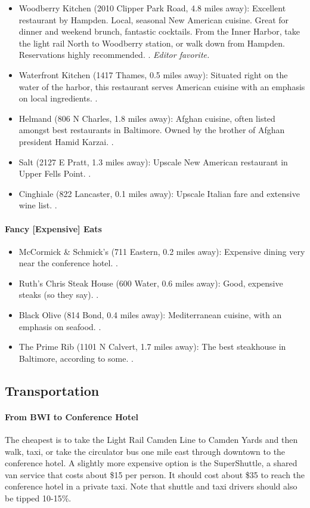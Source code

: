 \begin{itemize}
\item{Woodberry Kitchen (2010 Clipper Park Road, 4.8 miles away): Excellent restaurant by Hampden. Local, seasonal New American cuisine. Great for dinner and weekend brunch, fantastic cocktails. From the Inner Harbor, take the light rail North to Woodberry station, or walk down from Hampden. Reservations highly recommended.  \professor. \it{Editor favorite}.}
\item{Waterfront Kitchen (1417 Thames, 0.5 miles away): Situated right on the water of the harbor, this restaurant serves American cuisine with an emphasis on local ingredients. \professor.}
\item{Helmand (806 N Charles, 1.8 miles away): Afghan cuisine, often listed amongst best restaurants in Baltimore. Owned by the brother of Afghan president Hamid Karzai. \professor.}
\item{Salt (2127 E Pratt, 1.3 miles away): Upscale New American restaurant in Upper Fells Point. \professor.}
\item{Cinghiale (822 Lancaster, 0.1 miles away): Upscale Italian fare and extensive wine list. \industry.}
\end{itemize}

\paragraph*{Fancy [Expensive] Eats}

\begin{itemize}
\item{McCormick \& Schmick's (711 Eastern, 0.2 miles away): Expensive dining very near the conference hotel. \professor.}
\item{Ruth's Chris Steak House (600 Water, 0.6 miles away): Good, expensive steaks (so they say). \industry.}
\item{Black Olive (814 Bond, 0.4 miles away): Mediterranean cuisine, with an emphasis on seafood. \professor.}
\item{The Prime Rib (1101 N Calvert, 1.7 miles away): The best steakhouse in Baltimore, according to some. \industry.}
\end{itemize}

\subsection*{Transportation}

\paragraph*{From BWI to Conference Hotel}
The cheapest is to take the Light Rail Camden Line to Camden Yards and then walk, taxi, or take the circulator bus one mile east through downtown to the conference hotel. A slightly more expensive option is the SuperShuttle, a shared van service that costs about \$15 per person. It should cost about \$35 to reach the conference hotel in a private taxi. Note that shuttle and taxi drivers should also be tipped 10-15\%.

